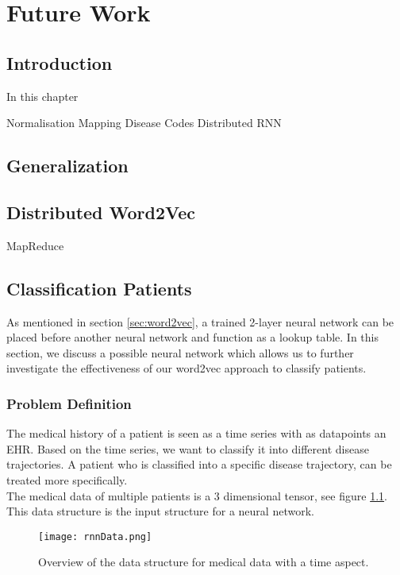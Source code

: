 \graphicspath{ {FutureWork/Images/} }


\chapter{Future Work}
\label{cha:futureWork}

\section{Introduction}
In this chapter 

Normalisation
Mapping Disease Codes
Distributed
RNN


\section{Generalization}




\section{Distributed Word2Vec}

MapReduce


\section{Classification Patients}

As mentioned in section \ref{sec:word2vec}, a trained 2-layer neural network can be placed before another neural network and function as a lookup table. In this section, we discuss a possible neural network which allows us to further investigate the effectiveness of our word2vec approach to classify patients.

\subsection{Problem Definition}

The medical history of a patient is seen as a time series with as datapoints an EHR. Based on the time series, we want to classify it into different disease trajectories. A patient who is classified into a specific disease trajectory, can be treated more specifically. \\

The medical data of multiple patients is a $3$ dimensional tensor, see figure \ref{fig:rnnData}. This data structure is the input structure for a neural network.

\begin{figure}[H]
	\centering
	\texttt{[image: rnnData.png]}
	\caption{Overview of the data structure for medical data with a time aspect.}
	\label{fig:rnnData}
\end{figure} 

